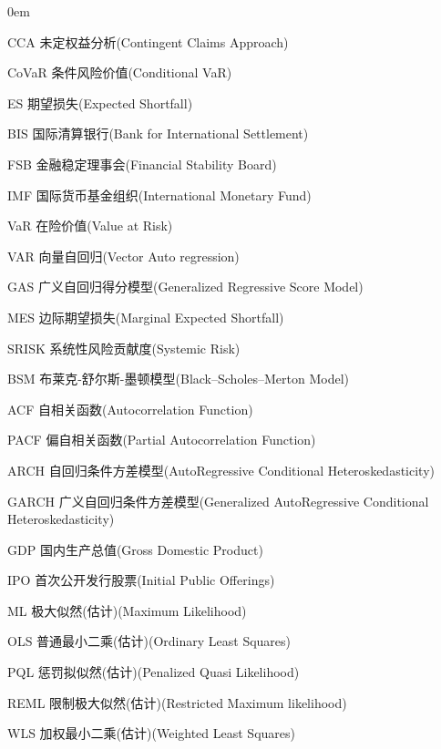 \begin{denotation}
\itemsep 0em

\item [CCA] 未定权益分析(Contingent Claims Approach)
\item [CoVaR] 条件风险价值(Conditional VaR)
\item [ES] 期望损失(Expected Shortfall)
\item [BIS] 国际清算银行(Bank for International Settlement)
\item [FSB] 金融稳定理事会(Financial Stability Board)
\item [IMF] 国际货币基金组织(International Monetary Fund)
\item [VaR] 在险价值(Value at Risk)
\item [VAR] 向量自回归(Vector Auto regression)
\item [GAS] 广义自回归得分模型(Generalized Regressive Score Model)
\item [MES] 边际期望损失(Marginal Expected Shortfall)
\item [SRISK] 系统性风险贡献度(Systemic Risk)
\item [BSM] 布莱克-舒尔斯-墨顿模型(Black–Scholes–Merton Model)
\item [ACF] 自相关函数(Autocorrelation Function)
\item [PACF] 偏自相关函数(Partial Autocorrelation Function)
\item [ARCH] 自回归条件方差模型(AutoRegressive Conditional Heteroskedasticity)
\item [GARCH] 广义自回归条件方差模型(Generalized AutoRegressive Conditional Heteroskedasticity)
\item [GDP] 国内生产总值(Gross Domestic Product)
\item [IPO] 首次公开发行股票(Initial Public Offerings)
\item [ML] 极大似然(估计)(Maximum Likelihood)
\item [OLS] 普通最小二乘(估计)(Ordinary Least Squares)
\item [PQL] 惩罚拟似然(估计)(Penalized Quasi Likelihood)
\item [REML] 限制极大似然(估计)(Restricted Maximum likelihood)
\item [WLS] 加权最小二乘(估计)(Weighted Least Squares)

\end{denotation}
